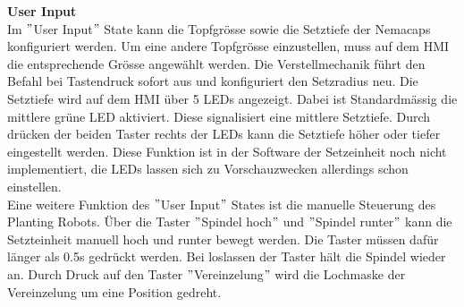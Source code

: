 \textbf{User Input}\\
Im $"$User Input$"$ State kann die Topfgrösse sowie die Setztiefe der Nemacaps konfiguriert werden. Um eine andere Topfgrösse einzustellen, muss auf dem HMI die entsprechende Grösse angewählt werden. Die Verstellmechanik führt den Befahl bei Tastendruck sofort aus und konfiguriert den Setzradius neu. Die Setztiefe wird auf dem HMI über 5 LEDs angezeigt. Dabei ist Standardmässig die mittlere grüne LED aktiviert. Diese signalisiert eine mittlere Setztiefe. Durch drücken der beiden Taster rechts der LEDs kann die Setztiefe höher oder tiefer eingestellt werden. Diese Funktion ist in der Software der Setzeinheit noch nicht implementiert, die LEDs lassen sich zu Vorschauzwecken allerdings schon einstellen.\\
Eine weitere Funktion des $"$User Input$"$ States ist die manuelle Steuerung des Planting Robots. Über die Taster $"$Spindel hoch$"$ und $"$Spindel runter$"$ kann die Setzteinheit manuell hoch und runter bewegt werden. Die Taster müssen dafür länger als 0.5s gedrückt werden. Bei loslassen der Taster hält die Spindel wieder an. Durch Druck auf den Taster $"$Vereinzelung$"$ wird die Lochmaske der Vereinzelung um eine Position gedreht.